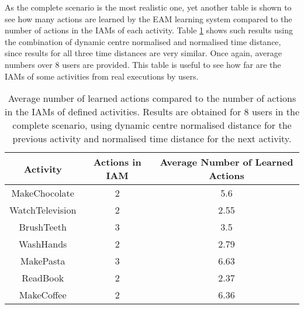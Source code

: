 As the complete scenario is the most realistic one, yet another table is shown to see how many actions are learned by the EAM learning system compared to the number of actions in the IAMs of each activity. Table \ref{tab-avg-actions-comp-t2} shows such results using the combination of dynamic centre normalised and normalised time distance, since results for all three time distances are very similar. Once again, average numbers over 8 users are provided. This table is useful to see how far are the IAMs of some activities from real executions by users.


\begin{table}[htbp]\scriptsize
  \begin{center}
        \begin{tabular}{ccc}
            \hline            
            \textbf{Activity} & \textbf{Actions in IAM} & \textbf{Average Number of Learned Actions} \\             
            \hline
            MakeChocolate   & 2 & 5.6 \\
	    WatchTelevision & 2 & 2.55 \\
	    BrushTeeth      & 3 & 3.5 \\
	    WashHands       & 2 & 2.79 \\
	    MakePasta       & 3 & 6.63 \\
	    ReadBook        & 2 & 2.37 \\
	    MakeCoffee      & 2 & 6.36 \\
            \hline
        \end{tabular}                
        \caption{Average number of learned actions compared to the number of actions in the IAMs of defined activities. Results are obtained for 8 users in the complete scenario, using dynamic centre normalised distance for the previous activity and normalised time distance for the next activity.}
        \label{tab-avg-actions-comp-t2}
    \end{center}
\end{table}